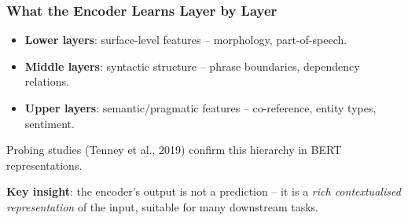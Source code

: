 \begin{frame}[fragile]\frametitle{What the Encoder Learns Layer by Layer}
\begin{itemize}
\item \textbf{Lower layers}: surface-level features – morphology, part-of-speech.
\item \textbf{Middle layers}: syntactic structure – phrase boundaries, dependency relations.
\item \textbf{Upper layers}: semantic/pragmatic features – co-reference, entity types, sentiment.
\end{itemize}

\vspace{0.4em}
Probing studies (Tenney et al., 2019) confirm this hierarchy in BERT representations.

\vspace{0.4em}
\textbf{Key insight}: the encoder's output is not a prediction – it is a \emph{rich contextualised representation} of the input, suitable for many downstream tasks.
\end{frame}


